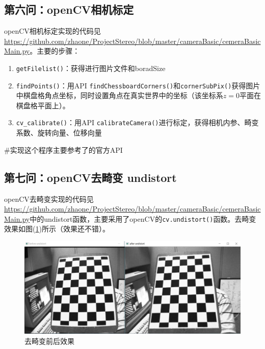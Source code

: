 \documentclass[UTF8]{ctexart}
\begin{document}
\subsection{第六问：openCV相机标定}
openCV相机标定实现的代码见\url{https://github.com/zhaone/ProjectStereo/blob/master/cameraBasic/cemeraBasicMain.py}。主要的步骤：
\begin{enumerate}
  \item \verb"getFilelist()"：获得进行图片文件和boradSize
  \item \verb"findPoints()"：用API \verb"findChessboardCorners()"和\verb"cornerSubPix()"获得图片中棋盘格角点坐标，同时设置角点在真实世界中的坐标（该坐标系$z=0$平面在棋盘格平面上）。
  \item \verb"cv_calibrate()"：用API \verb"calibrateCamera()"进行标定，获得相机内参、畸变系数、旋转向量、位移向量
\end{enumerate}
\#实现这个程序主要参考了\cite{opencvCameraCalibrationl18830}的官方API
\subsection{第七问：openCV去畸变 undistort}
openCV去畸变实现的代码见\url{https://github.com/zhaone/ProjectStereo/blob/master/cameraBasic/cemeraBasicMain.py}中的undistort函数，主要采用了openCV的\verb"cv.undistort()"函数。去畸变效果如图(\ref{fig:distort})所示（效果还不错）。
\begin{figure}[htp]%
	\centering  %
	\includegraphics[width=0.9\linewidth]{./figures/undistort.jpg} %
	\caption{去畸变前后效果}  %
	\label{fig:distort}   %
\end{figure}\\
\end{document}
